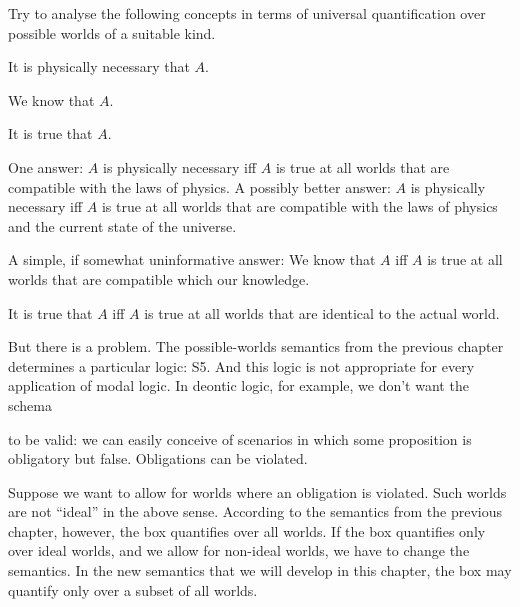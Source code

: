 \begin{exercise}
  Try to analyse the following concepts in terms of universal quantification over possible worlds of a suitable kind.
  \begin{exlist}
    \item It is physically necessary that $A$.
    \item We know that $A$.
    \item It is true that $A$.
  \end{exlist}
\end{exercise}
\begin{solution}
  \begin{sollist}
    \item One answer: $A$ is physically necessary iff $A$ is true at all worlds
    that are compatible with the laws of physics. A possibly better answer: $A$
    is physically necessary iff $A$ is true at all worlds that are compatible
    with the laws of physics and the current state of the universe.
    
    \item A simple, if somewhat uninformative answer: We know that $A$ iff $A$
    is true at all worlds that are compatible which our knowledge.

    \item It is true that $A$ iff $A$ is true at all worlds that are identical
    to the actual world.
  \end{sollist}
\end{solution}

But there is a problem. The possible-worlds semantics from the previous chapter
determines a particular logic: S5. And this logic is not appropriate for every
application of modal logic. In deontic logic, for example, we don't want the
schema
%
\begin{principles}
\end{principles}
%
to be valid: we can easily conceive of scenarios in which some proposition is
obligatory but false. Obligations can be violated.

Suppose we want to allow for worlds where an obligation is violated.
Such worlds are not ``ideal'' in the above sense.
According to the semantics from the previous chapter, however, the box quantifies over all worlds.
If the box quantifies only over ideal worlds,
and we allow for non-ideal worlds,
we have to change the semantics.
In the new semantics that we will develop in this chapter,
the box may quantify only over a subset of all worlds.

